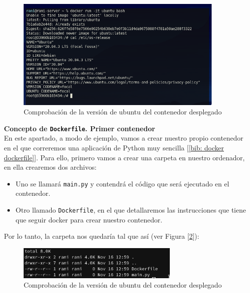 \documentclass[12pt]{article}
\begin{document}
	\begin{figure}[h]
		\begin{center}
			\includegraphics[width=0.9\textwidth]{img/docker_ubuntu_ver.png}
			\caption{Comprobación de la versión de ubuntu del contenedor desplegado}
			\label{img: docker ubuntu ver}
		\end{center}
	\end{figure}

	\pagebreak

	\noindent \textbf{\large Concepto de \texttt{Dockerfile}. Primer contenedor}\\
	
	\noindent En este apartado, a modo de ejemplo, vamos a crear nuestro propio contenedor en el que correremos una aplicación de Python muy sencilla [\ref{bib: docker dockerfile}]. Para ello, primero vamos a crear una carpeta en nuestro ordenador, en ella crearemos dos archivos:
	\begin{itemize}
		\item Uno se llamará \texttt{main.py} y contendrá el código que será ejecutado en el contenedor.
		\item Otro llamado \texttt{Dockerfile}, en el que detallaremos las instrucciones que tiene que seguir docker para crear nuestro contenedor.
	\end{itemize}

	\noindent Por lo tanto, la carpeta nos quedaría tal que así (ver Figura [\ref{img: docker file folder}]):
	
	\begin{figure}[h]
		\begin{center}
			\includegraphics[width=0.7\textwidth]{img/dockerfile_folder.png}
			\caption{Comprobación de la versión de ubuntu del contenedor desplegado}
			\label{img: docker file folder}
		\end{center}
	\end{figure}
	
\end{document}
